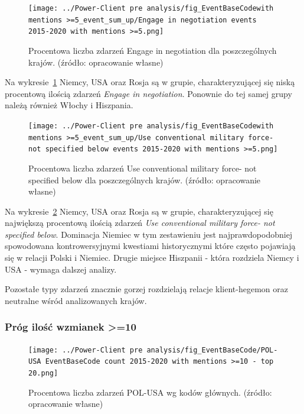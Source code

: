 \documentclass[11pt]{report}
\begin{document}
    \begin{figure}[!htp]
        \centering
        \texttt{[image: ../Power-Client pre analysis/fig\_EventBaseCodewith mentions >=5\_event\_sum\_up/Engage in negotiation events 2015-2020 with mentions >=5.png]}
        \caption{Procentowa liczba zdarzeń Engage in negotiation dla poszczególnych krajów. (źródło: opracowanie własne)}
        \label{fig:Power-Client:ERC:Mentions:SumUp:Engage in negotiation}
    \end{figure}
    Na wykresie~\ref{fig:Power-Client:ERC:Mentions:SumUp:Engage in negotiation} Niemcy, USA oraz Rosja są w grupie,
    charakteryzującej się niską procentową ilością zdarzeń \textit{Engage in negotiation}.
    Ponownie do tej samej grupy należą również Włochy i Hiszpania.

    \begin{figure}[!htp]
        \centering
        \texttt{[image: ../Power-Client pre analysis/fig\_EventBaseCodewith mentions >=5\_event\_sum\_up/Use conventional military force- not specified below events 2015-2020 with mentions >=5.png]}
        \caption{Procentowa liczba zdarzeń Use conventional military force- not specified below dla poszczególnych krajów. (źródło: opracowanie własne)}
        \label{fig:Power-Client:ERC:Goldstein:SumUp:Use conventional military force- not specified below}
    \end{figure}
    Na wykresie~\ref{fig:Power-Client:ERC:Goldstein:SumUp:Use conventional military force- not specified below} Niemcy, USA oraz Rosja są w grupie,
    charakteryzującej się największą procentową ilością zdarzeń \textit{Use conventional military force- not specified below}.
    Dominacja Niemiec w tym zestawieniu jest najprawdopodobniej spowodowana kontrowersyjnymi kwestiami historycznymi
    które często pojawiają się w relacji Polski i Niemiec.
    Drugie miejsce Hiszpanii - która rozdziela Niemcy i USA - wymaga dalszej analizy.

    Pozostałe typy zdarzeń znacznie gorzej rozdzielają relacje klient-hegemon oraz neutralne wśród analizowanych krajów.

    \subsubsection{Próg ilość wzmianek >=10}

    \begin{figure}[!htp]
        \centering
        \texttt{[image: ../Power-Client pre analysis/fig\_EventBaseCode/POL-USA EventBaseCode count 2015-2020 with mentions >=10 - top 20.png]}
        \caption{Procentowa liczba zdarzeń POL-USA wg kodów głównych. (źródło: opracowanie własne)}
        \label{fig:Power-Client:EBC:Mentions10:POL-USA}
    \end{figure}
\end{document}
